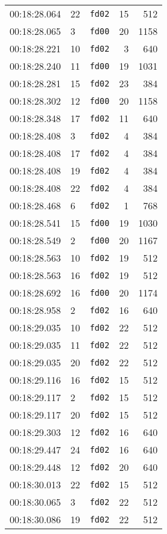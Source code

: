 \documentclass{article}
\begin{document}
\begin{longtable}{lllrr}
00:18:28.064 & 22 & \texttt{fd02} & 15 & 512 \\
00:18:28.065 & 3 & \texttt{fd00} & 20 & 1158 \\
00:18:28.221 & 10 & \texttt{fd02} & 3 & 640 \\
00:18:28.240 & 11 & \texttt{fd00} & 19 & 1031 \\
00:18:28.281 & 15 & \texttt{fd02} & 23 & 384 \\
00:18:28.302 & 12 & \texttt{fd00} & 20 & 1158 \\
00:18:28.348 & 17 & \texttt{fd02} & 11 & 640 \\
00:18:28.408 & 3 & \texttt{fd02} & 4 & 384 \\
00:18:28.408 & 17 & \texttt{fd02} & 4 & 384 \\
00:18:28.408 & 19 & \texttt{fd02} & 4 & 384 \\
00:18:28.408 & 22 & \texttt{fd02} & 4 & 384 \\
00:18:28.468 & 6 & \texttt{fd02} & 1 & 768 \\
00:18:28.541 & 15 & \texttt{fd00} & 19 & 1030 \\
00:18:28.549 & 2 & \texttt{fd00} & 20 & 1167 \\
00:18:28.563 & 10 & \texttt{fd02} & 19 & 512 \\
00:18:28.563 & 16 & \texttt{fd02} & 19 & 512 \\
00:18:28.692 & 16 & \texttt{fd00} & 20 & 1174 \\
00:18:28.958 & 2 & \texttt{fd02} & 16 & 640 \\
00:18:29.035 & 10 & \texttt{fd02} & 22 & 512 \\
00:18:29.035 & 11 & \texttt{fd02} & 22 & 512 \\
00:18:29.035 & 20 & \texttt{fd02} & 22 & 512 \\
00:18:29.116 & 16 & \texttt{fd02} & 15 & 512 \\
00:18:29.117 & 2 & \texttt{fd02} & 15 & 512 \\
00:18:29.117 & 20 & \texttt{fd02} & 15 & 512 \\
00:18:29.303 & 12 & \texttt{fd02} & 16 & 640 \\
00:18:29.447 & 24 & \texttt{fd02} & 16 & 640 \\
00:18:29.448 & 12 & \texttt{fd02} & 20 & 640 \\
00:18:30.013 & 22 & \texttt{fd02} & 15 & 512 \\
00:18:30.065 & 3 & \texttt{fd02} & 22 & 512 \\
00:18:30.086 & 19 & \texttt{fd02} & 22 & 512 \\

\end{longtable}
\end{document}

